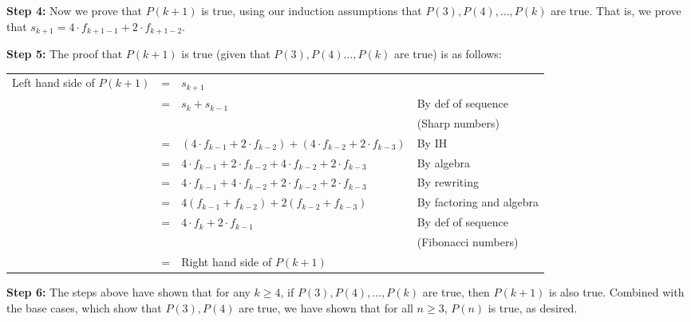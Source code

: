 \documentclass{article}
\begin{document}
\noindent\textbf{Step 4:} Now we prove that $P(k+1)$ is true, using our induction assumptions that $P(3),P(4),\ldots,P(k)$ are true. That is, we prove that $s_{k+1}=4\cdot f_{k+1-1}+2\cdot f_{k+1-2}$.

\vspace{15pt}


\noindent\textbf{Step 5:} The proof that $P(k+1)$ is true (given that $P(3),P(4)\ldots,P(k)$ are true) is as follows:
\vspace{5pt}

\begin{adjustwidth}{-1.5cm}{}
\noindent
\hspace{-3cm}
\begin{sloppypar}
	\begin{tabular}{l l l l}
		Left hand side of $P(k+1)$ & = & $s_{k+1}$ & \\
								   & = & $s_{k}+s_{k-1}$ & By def of sequence \\
								   &  & & (Sharp numbers)\\
								   & = & $(4\cdot f_{k-1}+2\cdot f_{k-2})+(4\cdot f_{k-2}+2\cdot f_{k-3})$ & By IH \\
								   & = & $4\cdot f_{k-1}+2\cdot f_{k-2}+4\cdot f_{k-2}+2\cdot f_{k-3}$ & By algebra\\
								   & = & $4\cdot f_{k-1}+4\cdot f_{k-2}+2\cdot f_{k-2}+2\cdot f_{k-3}$ & By rewriting \\
								   & = & $4(f_{k-1}+f_{k-2}) + 2(f_{k-2}+f_{k-3})$ & By factoring and algebra \\
								   & = & $4\cdot f_{k} + 2\cdot f_{k-1}$ & By def of sequence \\
								   &   & & (Fibonacci numbers)\\
								   & = & Right hand side of $P(k+1)$ & \\
								   
	\end{tabular}
\end{sloppypar}
\end{adjustwidth}
\vspace{15pt}

\textbf{Step 6:} The steps above have shown that for any $k\geq 4$, if $P(3),P(4),\ldots,P(k)$ are true, then $P(k+1)$ is also true. Combined with the base cases, which show that $P(3),P(4)$ are true, we have shown that for all $n\geq 3$, $P(n)$ is true, as desired.
\end{document}
